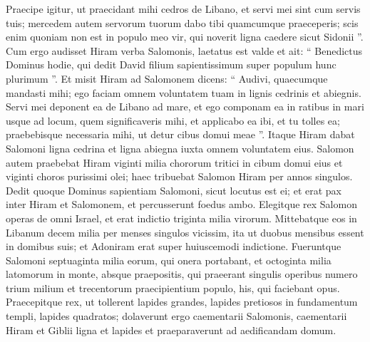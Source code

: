 \begin{biblechapter}
\begin{biblechapter}
\begin{biblechapter}
\begin{biblechapter}
\begin{biblechapter}
\verse Praecipe igitur, ut praecidant mihi cedros de Libano, et servi mei sint cum servis tuis; mercedem autem servorum tuorum dabo tibi quamcumque praeceperis; scis enim quoniam non est in populo meo vir, qui noverit ligna caedere sicut Sidonii ”.
 \verse Cum ergo audisset Hiram verba Salomonis, laetatus est valde et ait: “ Benedictus Dominus hodie, qui dedit David filium sapientissimum super populum hunc plurimum ”. 
\verse Et misit Hiram ad Salomonem dicens: “ Audivi, quaecumque mandasti mihi; ego faciam omnem voluntatem tuam in lignis cedrinis et abiegnis. 
\verse Servi mei deponent ea de Libano ad mare, et ego componam ea in ratibus in mari usque ad locum, quem significaveris mihi, et applicabo ea ibi, et tu tolles ea; praebebisque necessaria mihi, ut detur cibus domui meae ”.
 \verse Itaque Hiram dabat Salomoni ligna cedrina et ligna abiegna iuxta omnem voluntatem eius. 
\verse Salomon autem praebebat Hiram viginti milia chororum tritici in cibum domui eius et viginti choros purissimi olei; haec tribuebat Salomon Hiram per annos singulos. 
\verse Dedit quoque Dominus sapientiam Salomoni, sicut locutus est ei; et erat pax inter Hiram et Salomonem, et percusserunt foedus ambo.
 \verse Elegitque rex Salomon operas de omni Israel, et erat indictio triginta milia virorum. 
\verse Mittebatque eos in Libanum decem milia per menses singulos vicissim, ita ut duobus mensibus essent in domibus suis; et Adoniram erat super huiuscemodi indictione. 
\verse Fueruntque Salomoni septuaginta milia eorum, qui onera portabant, et octoginta milia latomorum in monte, 
\verse absque praepositis, qui praeerant singulis operibus numero trium milium et trecentorum praecipientium populo, his, qui faciebant opus. 
\verse Praecepitque rex, ut tollerent lapides grandes, lapides pretiosos in fundamentum templi, lapides quadratos; 
\verse dolaverunt ergo caementarii Salomonis, caementarii Hiram et Giblii ligna et lapides et praeparaverunt ad aedificandam domum.
 

\end{biblechapter}
\end{biblechapter}
\end{biblechapter}
\end{biblechapter}
\end{biblechapter}
